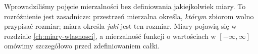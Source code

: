 \begin{uwaga}
Wprowadziliśmy pojęcie mierzalności bez definiowania jakiejkolwiek
miary. To rozróżnienie jest zasadnicze: przestrzeń mierzalna określa,
\emph{którym} zbiorom wolno przypisać rozmiar; miara określa
\emph{jaki} jest ten rozmiar. Miary pojawią się w rozdziale
\ref{ch:miary-wlasnosci}, a mierzalność funkcji o wartościach
w $[-\infty,\infty]$ omówimy szczegółowo przed zdefiniowaniem całki.
\end{uwaga}
